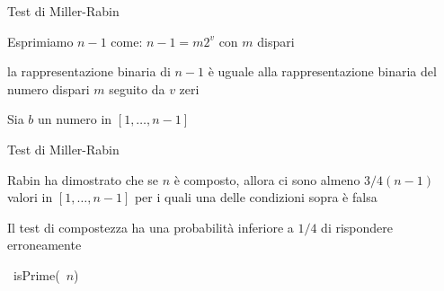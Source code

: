 \begin{frame}{Test di Miller-Rabin}

\vspace{-9pt}
\BIL
\item Esprimiamo $n-1$ come: $n-1 = m 2^v$ con $m$ dispari
  \BI
  \item la rappresentazione binaria di $n-1$ è uguale alla rappresentazione 
    binaria del numero dispari $m$ seguito da $v$ zeri
  \EI
\item Sia $b$ un numero in $[1, \ldots, n-1]$
\EIL

\end{frame}

\begin{frame}{Test di Miller-Rabin}

\vspace{-9pt}
\BIL
\item Rabin ha dimostrato che se $n$ è composto, allora ci sono
almeno $3/4(n-1)$ valori in $[1, \ldots, n-1]$ per i quali una delle condizioni sopra è falsa
\item Il test di compostezza ha una probabilità inferiore a $1/4$ di rispondere
erroneamente
\EIL

\begin{Procedure}
\caption[A]{\BOOLEAN\ \textsf{isPrime}(\INTEGER\ $n$)}
\Return \TRUE\;
\end{Procedure}

\end{frame}

